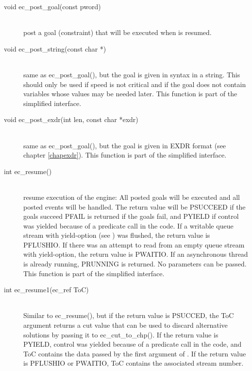 \begin{description}
\item[void		ec_post_goal(const pword)]\ \\
	post a goal (constraint) that will be executed when \eclipse
	is resumed.

\item[void		ec_post_string(const char *)]\ \\
	same as ec_post_goal(), but the goal is given in {\eclipse} syntax
	in a string. This should only be used if speed is not critical
	and if the goal does not contain variables whose values may be
	needed later.
	This function is part of the simplified interface.

\item[void		ec_post_exdr(int len, const char *exdr)]\ \\
	same as ec_post_goal(), but the goal is given in EXDR format
	(see chapter \ref{chapexdr}).
	This function is part of the simplified interface.

\item[int		ec_resume()]\ \\
	resume execution of the {\eclipse} engine: All posted goals will
	be executed and all posted events will be handled.
	The return value will be PSUCCEED if the goals succeed
	PFAIL is returned if the goals fail, and PYIELD if control was
	yielded because of a
	predicate call in the {\eclipse} code.
	If a writable queue stream with yield-option
	(see )
	was flushed, the return value is PFLUSHIO.
	If there was an attempt to read from an empty queue stream with
	yield-option, the return value is PWAITIO.
	If an asynchronous {\eclipse} thread is already running,
	PRUNNING is returned.
	No parameters can be passed.
	This function is part of the simplified interface.

\item[int		ec_resume1(ec_ref ToC)]\ \\
	Similar to ec_resume(), but if the return value is PSUCCED,
	the ToC argument returns a cut value that can be used to discard
	alternative solutions by passing it to ec_cut_to_chp().
	If the return value is PYIELD, control was yielded because of a
	predicate call in the {\eclipse} code, and ToC contains the data
	passed by the first argument of
	.
	If the return value is PFLUSHIO or PWAITIO, ToC contains
	the associated stream number.


\end{description}
